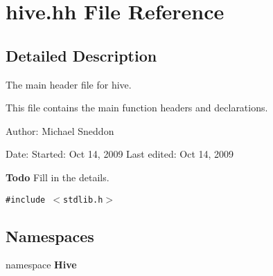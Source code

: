 \section{hive.hh File Reference}
\label{hive_8hh}


\subsection{Detailed Description}
The main header file for hive. 

This file contains the main function headers and declarations.

\begin{Desc}
\item[Author:]Michael Sneddon \end{Desc}
\begin{Desc}
\item[Date:]Started: Oct 14, 2009 Last edited: Oct 14, 2009\end{Desc}
\begin{Desc}
\item[{\bf Todo}]Fill in the details.\end{Desc}


{\tt \#include $<$stdlib.h$>$}\par
\subsection*{Namespaces}
\begin{CompactItemize}
\item 
namespace {\bf Hive}
\end{CompactItemize}
